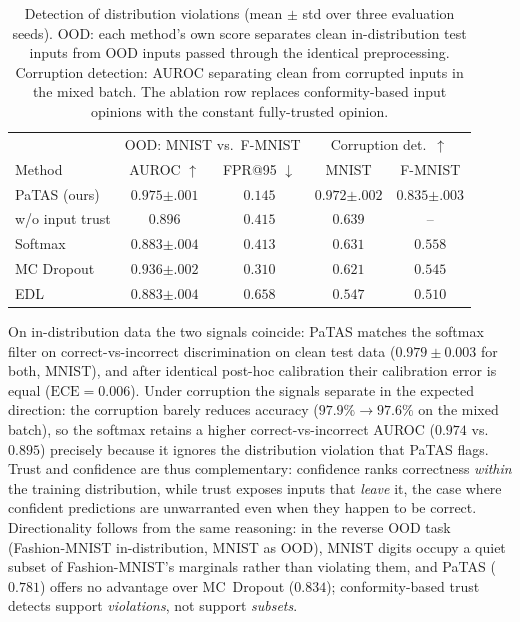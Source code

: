 \begin{table}[ht]
\centering
\setlength{\tabcolsep}{3.5pt}
\begin{tabular}{lcccc}
\toprule
 & \multicolumn{2}{c}{OOD: MNIST vs.\ F-MNIST} & \multicolumn{2}{c}{Corruption det.\ $\uparrow$} \\
Method & AUROC $\uparrow$ & FPR@95 $\downarrow$ & MNIST & F-MNIST \\
\midrule
PaTAS (ours) & $\mathbf{0.975}{\scriptstyle\pm.001}$ & $\mathbf{0.145}$ & $\mathbf{0.972}{\scriptstyle\pm.002}$ & $\mathbf{0.835}{\scriptstyle\pm.003}$ \\
\;\;w/o input trust & $0.896$ & $0.415$ & $0.639$ & -- \\
Softmax & $0.883{\scriptstyle\pm.004}$ & $0.413$ & $0.631$ & $0.558$ \\
MC Dropout & $0.936{\scriptstyle\pm.002}$ & $0.310$ & $0.621$ & $0.545$ \\
EDL & $0.883{\scriptstyle\pm.004}$ & $0.658$ & $0.547$ & $0.510$ \\
\bottomrule
\end{tabular}
\caption{Detection of distribution violations (mean $\pm$ std over three evaluation seeds). OOD: each method's own score separates clean in-distribution test inputs from OOD inputs passed through the identical preprocessing. Corruption detection: AUROC separating clean from corrupted inputs in the mixed batch. The ablation row replaces conformity-based input opinions with the constant fully-trusted opinion.}
\label{tab:comparative}
\end{table}

On in-distribution data the two signals coincide: PaTAS matches the softmax filter on correct-vs-incorrect discrimination on clean test data ($0.979 \pm 0.003$ for both, MNIST), and after identical post-hoc calibration their calibration error is equal ($\mathrm{ECE}=0.006$). Under corruption the signals separate in the expected direction: the corruption barely reduces accuracy ($97.9\% \to 97.6\%$ on the mixed batch), so the softmax retains a higher correct-vs-incorrect AUROC ($0.974$ vs.\ $0.895$) precisely because it ignores the distribution violation that PaTAS flags. Trust and confidence are thus complementary: confidence ranks correctness \emph{within} the training distribution, while trust exposes inputs that \emph{leave} it, the case where confident predictions are unwarranted even when they happen to be correct. Directionality follows from the same reasoning: in the reverse OOD task (Fashion-MNIST in-distribution, MNIST as OOD), MNIST digits occupy a quiet subset of Fashion-MNIST's marginals rather than violating them, and PaTAS ($0.781$) offers no advantage over MC~Dropout ($0.834$); conformity-based trust detects support \emph{violations}, not support \emph{subsets}.

